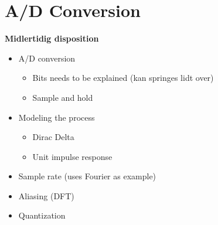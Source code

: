 \chapter{A/D Conversion}





\textbf{Midlertidig disposition}
\begin{itemize}
    \item A/D conversion
    \begin{itemize}
        \item Bits needs to be explained (kan springes lidt over)
        \item Sample and hold
    \end{itemize}
    \item Modeling the process
    \begin{itemize}
        \item Dirac Delta
        \item Unit impulse response
    \end{itemize}
    \item Sample rate (uses Fourier as example)
    \item Aliasing (DFT)
    \item Quantization
\end{itemize}